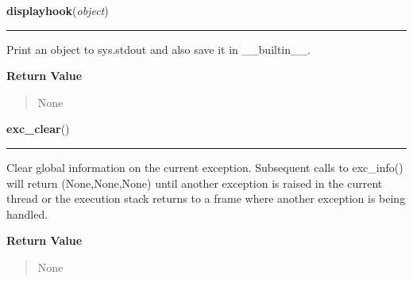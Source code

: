     \label{sys:displayhook}

    \vspace{0.5ex}

\hspace{.8\funcindent}\begin{boxedminipage}{\funcwidth}

    \raggedright \textbf{displayhook}(\textit{object})

    \vspace{-1.5ex}

    \rule{\textwidth}{0.5\fboxrule}
\setlength{\parskip}{2ex}
    Print an object to sys.stdout and also save it in \_\_builtin\_\_.

\setlength{\parskip}{1ex}
      \textbf{Return Value}
    \vspace{-1ex}

      \begin{quote}
      None

      \end{quote}

    \end{boxedminipage}

    \label{sys:exc_clear}

    \vspace{0.5ex}

\hspace{.8\funcindent}\begin{boxedminipage}{\funcwidth}

    \raggedright \textbf{exc\_clear}()

    \vspace{-1.5ex}

    \rule{\textwidth}{0.5\fboxrule}
\setlength{\parskip}{2ex}
    Clear global information on the current exception.  Subsequent calls to
    exc\_info() will return (None,None,None) until another exception is 
    raised in the current thread or the execution stack returns to a frame 
    where another exception is being handled.

\setlength{\parskip}{1ex}
      \textbf{Return Value}
    \vspace{-1ex}

      \begin{quote}
      None

      \end{quote}

    \end{boxedminipage}

